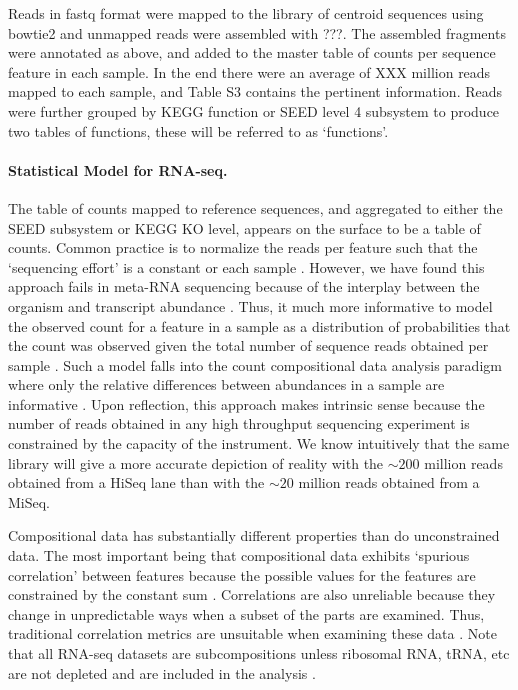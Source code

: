 \documentclass[10pt,letterpaper]{article}
\begin{document}
Reads in fastq format were mapped to the library of centroid sequences using bowtie2 \cite{bowtie2} and unmapped reads were assembled with ???. The assembled fragments were annotated as above, and added to the master table of counts per sequence feature in each sample. In the end there were an average of XXX million reads mapped to each sample, and Table S3 contains the pertinent information. Reads were further grouped by KEGG function or SEED level 4 subsystem to produce two tables of functions, these will be referred to as `functions'.

\paragraph{Statistical Model for RNA-seq.} The table of counts mapped to reference sequences, and aggregated to either the SEED subsystem or KEGG KO level, appears on the surface to be a table of counts. Common practice is to normalize the  reads per feature such that the `sequencing effort' is a constant or each sample \cite{Anders:2013aa}. However, we  have found this approach  fails in meta-RNA sequencing because of the interplay between the organism and transcript abundance \cite{fernandes:2013,fernandes:2014,Lovell:2015}. Thus, it much more informative to model the observed count for a feature in a sample as a distribution of probabilities that the count was observed given the total number of sequence reads obtained per sample \cite{fernandes:2013}. Such a model falls into the count compositional data analysis paradigm \cite{Aitchison:1986} where only the relative differences between abundances in a sample are informative \cite{pawlowsky2015modeling,pawlowsky2011compositional}. Upon reflection, this approach makes intrinsic sense because the number of reads obtained in any high throughput sequencing experiment is constrained by the capacity of the instrument. We know intuitively that the same library will give a more accurate depiction of reality with the $\sim 200$ million reads obtained from a HiSeq lane than with the $\sim 20$ million reads obtained from a MiSeq.

Compositional data has substantially different properties than do unconstrained data. The most important being that compositional data exhibits `spurious correlation' between features because the possible values for  the features are constrained by the constant sum \cite{pawlowsky2015modeling,pawlowsky2011compositional}. Correlations are also unreliable because they change in unpredictable ways when a subset of the parts are examined. Thus, traditional correlation metrics are unsuitable when examining these data \cite{Lovell:2015}. Note that  all RNA-seq datasets are subcompositions unless ribosomal RNA, tRNA, etc are not depleted and are included in the analysis \cite{pawlowsky2015modeling,pawlowsky2011compositional}. 
\end{document}
